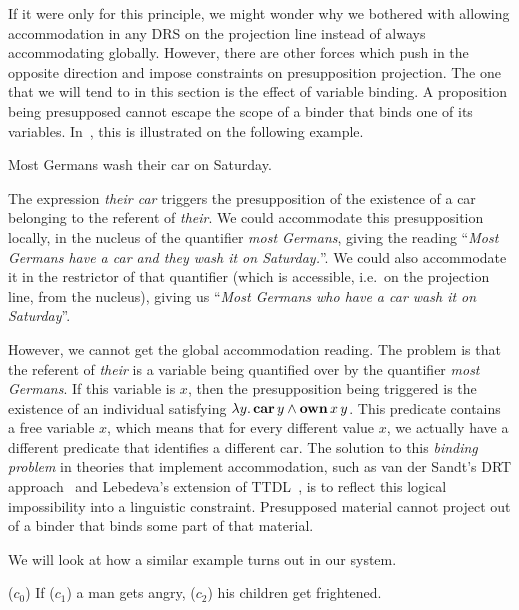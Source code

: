If it were only for this principle, we might wonder why we bothered with
allowing accommodation in any DRS on the projection line instead of always
accommodating globally. However, there are other forces which push in the
opposite direction and impose constraints on presupposition projection. The
one that we will tend to in this section is the effect of variable
binding. A proposition being presupposed cannot escape the scope of a
binder that binds one of its variables. In~\cite{sep-presupposition}, this
is illustrated on the following example.

\begin{exe}
  \ex \label{ex:most-germans-wash} Most Germans wash their car on Saturday.
\end{exe}

The expression \emph{their car} triggers the presupposition of the
existence of a car belonging to the referent of \emph{their}. We could
accommodate this presupposition locally, in the nucleus of the quantifier
\emph{most Germans}, giving the reading ``\emph{Most Germans have a car and
  they wash it on Saturday.}''. We could also accommodate it in the
restrictor of that quantifier (which is accessible, i.e.\ on the projection
line, from the nucleus), giving us ``\emph{Most Germans who have a car wash
  it on Saturday}''.

However, we cannot get the global accommodation reading. The problem is
that the referent of \emph{their} is a variable being quantified over by
the quantifier \emph{most Germans}. If this variable is $x$, then the
presupposition being triggered is the existence of an individual satisfying
$\lambda y.\, \textbf{car}\,y \land \textbf{own}\,x\,y$. This predicate contains a
free variable $x$, which means that for every different value $x$, we
actually have a different predicate that identifies a different car. The
solution to this \emph{binding problem} in theories that implement
accommodation, such as van der Sandt's DRT
approach~\cite{van1992presupposition} and Lebedeva's extension of
TTDL~\cite{lebedeva2012expression}, is to reflect this logical
impossibility into a linguistic constraint. Presupposed material cannot
project out of a binder that binds some part of that material.

We will look at how a similar example turns out in our system.

\begin{exe}
  \ex \label{ex:man-angry} ($c_0$) If ($c_1$) a man gets angry, ($c_2$) his
  children get frightened.
\end{exe}

